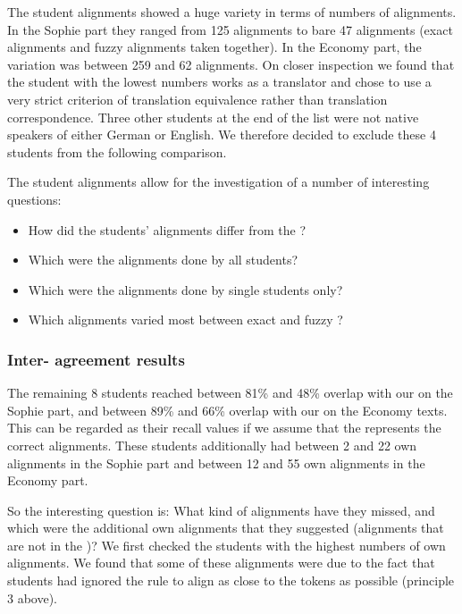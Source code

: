 \documentclass[output=paper]{LSP/langsci}
\begin{document}
The student alignments showed a huge variety in terms of numbers of alignments. In the Sophie part they ranged from 125 alignments to bare 47 alignments (exact alignments and fuzzy alignments taken together). In the Economy part, the variation was between 259 and 62 alignments. On closer inspection we found that the student with the lowest numbers works as a translator and chose to use a very strict criterion of translation equivalence rather than translation correspondence. Three other students at the end of the list were not native speakers of either German or English. We therefore decided to exclude these 4 students from the following comparison. 

The student alignments allow for the investigation of a number of interesting questions: 

\begin{itemize}
\item How did the students' alignments differ from the ? 
\item Which were the alignments done by all students? 
\item Which were the alignments done by single students only? 
\item Which alignments varied most between exact and fuzzy ?
\end{itemize}

\subsubsection{Inter- agreement results}\label{sec:volk:2.2.4}

The remaining 8 students reached between 81\% and 48\% overlap with our  on the Sophie part, and between 89\% and 66\% overlap with our  on the Economy texts. This can be regarded as their recall values if we assume that the  represents the correct alignments. These students additionally had between 2 and 22 own alignments in the Sophie part and between 12 and 55 own alignments in the Economy part. 

So the interesting question is: What kind of alignments have they missed, and which were the additional own alignments that they suggested (alignments that are not in the )? We first checked the students with the highest numbers of own alignments. We found that some of these alignments were due to the fact that students had ignored the rule to align as close to the tokens as possible (principle 3 above). 
\end{document}
